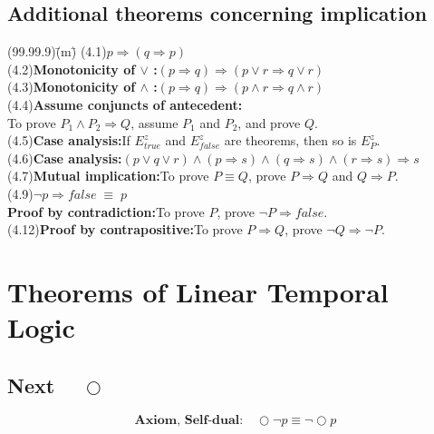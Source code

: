 \documentclass[fleqn, leqno]{article}
\newcommand{\lgap}{2pt}                             %
\newcommand{\equivs}{\ensuremath{\;\equiv\;}}       %
\newcommand{\impl}{\ensuremath{\Rightarrow}}        %
\newcommand{\Next}{\bigcirc}
\newcommand{\firstspacer}{\vspace{-26pt}}
\begin{document}
\subsection*{Additional theorems concerning implication}
\begin{tabbing}
(99.99.9)\;\=(m)\;\=\kill
(4.1)\>$p\impl (q\impl p)$\\[\lgap]
(4.2)\>\textbf{Monotonicity of $\lor$ :}\quad $(p\impl q) \impl (p\lor r \impl q\lor r)$\\[\lgap]
(4.3)\>\textbf{Monotonicity of $\land$ :}\quad $(p\impl q) \impl (p\land r \impl q\land r)$\\[\lgap]
(4.4)\>\textbf{Assume conjuncts of antecedent:}\\[\lgap]
      \>To prove $P_{1}\land P_{2}\impl Q$, assume $P_{1}$ and $P_{2}$, and prove $Q$.\\[\lgap]
(4.5)\>\textbf{Case analysis:}\quad If $E^{z}_{true}$ and $E^{z}_{false}$ are theorems, then so is $E^{z}_{P}$.\\[\lgap]
(4.6)\>\textbf{Case analysis:}\quad $(p\lor q\lor r)\land (p\impl s)\land (q\impl s)\land (r\impl s)\impl s$\\[\lgap]
(4.7)\>\textbf{Mutual implication:}\quad To prove $P\equiv Q$, prove $P\impl Q$ and $Q\impl P$.\\[\lgap]
(4.9)\>$\neg p\impl false \equivs p$\\
     \>\textbf{Proof by contradiction:}\quad To prove $P$, prove $\neg P\impl false$.\\[\lgap]
(4.12)\>\textbf{Proof by contrapositive:}\quad To prove $P\impl Q$, prove $\neg Q\impl \neg P$.\\
\end{tabbing}

\pagebreak

\section*{Theorems of Linear Temporal Logic}

\subsection*{Next $\quad\Next$}

\begin{equation}\label{E:selfDual}
\textbf{Axiom, Self-dual:}\quad \Next\lnot p \equiv \lnot\Next p
\end{equation}

\firstspacer
\end{document}
